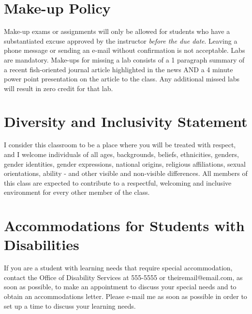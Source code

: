 \documentclass[a4paper]{modular_syllabus} %
\begin{document}

\newpage %

\makeSide %


\vspace{0.5cm}
\section{Make-up Policy}

Make-up exams or assignments will only be allowed for students who have a substantiated excuse approved by the instructor \emph{before the due date}. Leaving a phone message or sending an e-mail without confirmation is not acceptable. Labs are mandatory. Make-ups for missing a lab consists of a 1 paragraph summary of a recent fish-oriented journal article highlighted in the news AND a 4 minute power point presentation on the article to the class. Any additional missed labs will result in zero credit for that lab.

\vspace{0.5cm}
\section{Diversity and Inclusivity Statement}

I consider this classroom to be a place where you will be treated with respect, and I welcome individuals of all ages, backgrounds, beliefs, ethnicities, genders, gender identities, gender expressions, national origins, religious affiliations, sexual orientations, ability - and other visible and non-visible differences. All members of this class are expected to contribute to a respectful, welcoming and inclusive environment for every other member of the class.

\vspace{0.5cm}
\section{Accommodations for Students with Disabilities}

If you are a student with learning needs that require special accommodation, contact the Office of Disability Services at 555-5555 or theiremail@email.com, as soon as possible, to make an appointment to discuss your special needs and to obtain an accommodations letter.  Please e-mail me as soon as possible in order to set up a time to discuss your learning needs.
\end{document}
